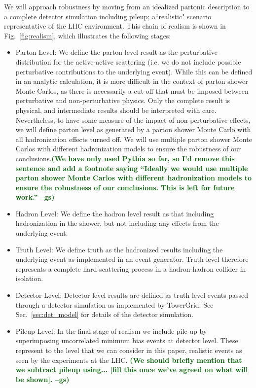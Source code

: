 \documentclass[11pt,letterpaper]{article}
\DeclareRobustCommand{\Sec}[1]{Sec.~\ref{#1}}
\DeclareRobustCommand{\Fig}[1]{Fig.~\ref{#1}}
\newcommand{\gs}[1]{\textbf{\textcolor{darkgreen}{(#1 --gs)}}}
\begin{document}
We will approach robustness by moving from an idealized partonic description to a complete detector simulation including pileup; a``realistic" scenario representative of the LHC environment. This chain of realism is shown in \Fig{fig:realism}, which illustrates the following stages:
\begin{itemize}
\item Parton Level: We define the parton level result as the
  perturbative distribution for the active-active scattering (i.e. we
  do not include possible perturbative contributions to the underlying
  event). While this can be defined in an analytic calculation, it is
  more difficult in the context of parton shower Monte Carlos, as
  there is necessarily a cut-off that must be imposed between
  perturbative and non-perturbative physics. Only the complete result
  is physical, and intermediate results should be interpreted with
  care. Nevertheless, to have some measure of the impact of
  non-perturbative effects, we will define parton level as generated
  by a parton shower Monte Carlo with all hadronization effects turned
  off.
  We will use multiple parton shower Monte Carlos with different
  hadronization models to ensure the robustness of our
  conclusions.\gs{We have only used Pythia so far, so I'd remove this
    sentence and add a footnote saying ``Ideally we would use multiple
    parton shower Monte Carlos with different hadronization models to
    ensure the robustness of our conclusions. This is left for future
    work.''}
\item Hadron Level: We define the hadron level result as that including hadronization in the shower, but not including any effects from the underlying event.
\item Truth Level: We define truth as the hadronized results including the underlying event as implemented in an event generator. Truth level therefore represents a complete hard scattering process in a hadron-hadron collider in isolation.
\item Detector Level: Detector level results are defined as truth level events passed through a detector simulation as implemented by TowerGrid. See \Sec{sec:det_model} for details of the detector simulation.
\item Pileup Level: In the final stage of realism we include pile-up
  by superimposing uncorrelated minimum bias events at detector
  level. These represent to the level that we can consider in this
  paper, realistic events as seen by the experiments at the
  LHC. \gs{We should briefly mention that we subtract pileup
    using... [fill this once we've agreed on what will be shown].}
\end{itemize}
\end{document}
